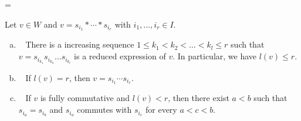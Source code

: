 \setbox\toto=\hbox{\cite[Lemma~3.1 and Proposition~3.4]{GK}}
\begin{lemm}[\box\toto]
\label{lem:red}
Let $v \in W$ and $v = s_{i_1} * \cdots * s_{i_r}$ with $i_1, \dots, i_r \in I$.
\begin{enumerate}[(a)]
\item~\label{lemma3.12_a} %
There is a increasing sequence $1 \le k_1 < k_2 < \dots < k_l \le r$ such that 
$v = s_{i_{k_1}} s_{i_{k_2}} \dots s_{i_{k_l}}$ is a reduced expression of $v$.
In particular, we have $l(v) \le r$.
\item~\label{lemma3.12_b} %
If $l(v) = r$, then $v = s_{i_1} \cdots s_{i_r}$.
\item~\label{lemma3.12_c} %
If $v$ is fully commutative and $l(v) < r$, 
then there exist $a < b$ such that $s_{i_a} = s_{i_b}$ and
$s_{i_a}$ commutes with $s_{i_c}$ for every $a < c < b$.
\end{enumerate}
\end{lemm}

